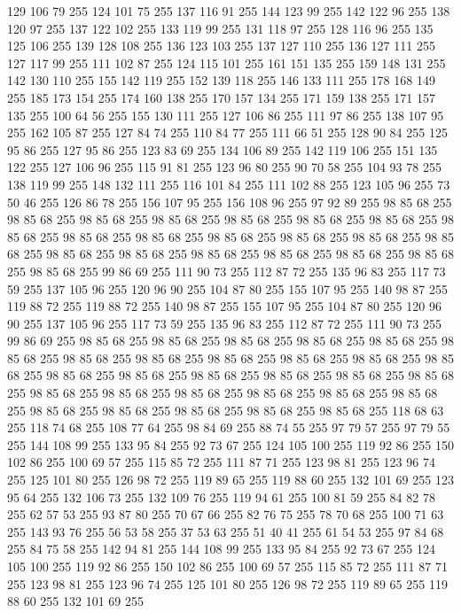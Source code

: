 129 106 79 255 124 101 75 255 137 116 91 255 144 123 99 255 142 122 96 255 138 120 97 255 137 122 102 255 133 119 99 255 131 118 97 255 128 116 96 255 135 125 106 255 139 128 108 255 136 123 103 255 137 127 110 255 136 127 111 255 127 117 99 255 111 102 87 255 124 115 101 255 161 151 135 255 159 148 131 255 142 130 110 255 155 142 119 255 152 139 118 255 146 133 111 255 178 168 149 255 185 173 154 255 174 160 138 255 170 157 134 255 171 159 138 255 171 157 135 255 100 64 56 255 155 130 111 255 127 106 86 255 111 97 86 255 138 107 95 255 162 105 87 255 127 84 74 255 110 84 77 255 111 66 51 255 128 90 84 255 125 95 86 255 127 95 86 255 123 83 69 255 134 106 89 255 142 119 106 255 151 135 122 255 127 106 96 255 115 91 81 255 123 96 80 255 90 70 58 255 104 93 78 255 138 119 99 255 148 132 111 255 116 101 84 255 111 102 88 255 123 105 96 255 73 50 46 255 126 86 78 255 156 107 95 255 156 108 96 255 97 92 89 255 98 85 68 255 98 85 68 255 98 85 68 255
98 85 68 255 98 85 68 255 98 85 68 255 98 85 68 255 98 85 68 255 98 85 68 255 98 85 68 255 98 85 68 255 98 85 68 255 98 85 68 255 98 85 68 255 98 85 68 255 98 85 68 255 98 85 68 255 98 85 68 255 98 85 68 255 98 85 68 255 98 85 68 255 99 86 69 255 111 90 73 255 112 87 72 255 135 96 83 255 117 73 59 255 137 105 96 255 120 96 90 255 104 87 80 255 155 107 95 255 140 98 87 255 119 88 72 255 119 88 72 255 140 98 87 255 155 107 95 255 104 87 80 255 120 96 90 255 137 105 96 255 117 73 59 255 135 96 83 255 112 87 72 255 111 90 73 255 99 86 69 255 98 85 68 255 98 85 68 255 98 85 68 255 98 85 68 255 98 85 68 255 98 85 68 255 98 85 68 255 98 85 68 255 98 85 68 255 98 85 68 255 98 85 68 255 98 85 68 255 98 85 68 255 98 85 68 255 98 85 68 255 98 85 68 255 98 85 68 255 98 85 68 255 98 85 68 255 98 85 68 255 98 85 68 255 98 85 68 255 98 85 68 255 98 85 68 255
98 85 68 255 98 85 68 255 98 85 68 255 98 85 68 255 98 85 68 255 118 68 63 255 118 74 68 255 108 77 64 255 98 84 69 255 88 74 55 255 97 79 57 255 97 79 55 255 144 108 99 255 133 95 84 255 92 73 67 255 124 105 100 255 119 92 86 255 150 102 86 255 100 69 57 255 115 85 72 255 111 87 71 255 123 98 81 255 123 96 74 255 125 101 80 255 126 98 72 255 119 89 65 255 119 88 60 255 132 101 69 255 123 95 64 255 132 106 73 255 132 109 76 255 119 94 61 255 100 81 59 255 84 82 78 255 62 57 53 255 93 87 80 255 70 67 66 255 82 76 75 255 78 70 68 255 100 71 63 255 143 93 76 255 56 53 58 255 37 53 63 255 51 40 41 255 61 54 53 255 97 84 68 255 84 75 58 255 142 94 81 255 144 108 99 255 133 95 84 255 92 73 67 255 124 105 100 255 119 92 86 255 150 102 86 255 100 69 57 255 115 85 72 255 111 87 71 255 123 98 81 255 123 96 74 255 125 101 80 255 126 98 72 255 119 89 65 255 119 88 60 255 132 101 69 255
